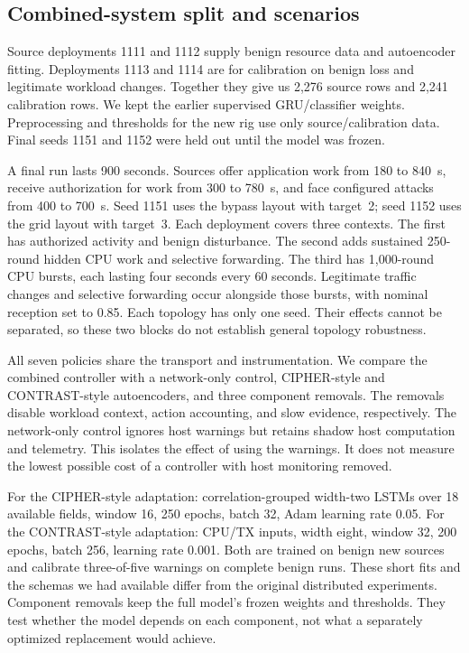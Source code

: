 \documentclass[journal]{IEEEtran}
\begin{document}
\subsection{Combined-system split and scenarios}\label{sec:combinedsetup}
Source deployments 1111 and 1112 supply benign resource data and autoencoder fitting. Deployments 1113 and 1114 are for calibration on benign loss and legitimate workload changes. Together they give us 2,276 source rows and 2,241 calibration rows. We kept the earlier supervised GRU/classifier weights. Preprocessing and thresholds for the new rig use only source/calibration data. Final seeds 1151 and 1152 were held out until the model was frozen.

A final run lasts 900 seconds. Sources offer application work from 180 to 840~s, receive authorization for work from 300 to 780~s, and face configured attacks from 400 to 700~s. Seed 1151 uses the bypass layout with target~2; seed 1152 uses the grid layout with target~3. Each deployment covers three contexts. The first has authorized activity and benign disturbance. The second adds sustained 250-round hidden CPU work and selective forwarding. The third has 1,000-round CPU bursts, each lasting four seconds every 60 seconds. Legitimate traffic changes and selective forwarding occur alongside those bursts, with nominal reception set to 0.85. Each topology has only one seed. Their effects cannot be separated, so these two blocks do not establish general topology robustness.

All seven policies share the transport and instrumentation. We compare the combined controller with a network-only control, CIPHER-style and CONTRAST-style autoencoders, and three component removals. The removals disable workload context, action accounting, and slow evidence, respectively. The network-only control ignores host warnings but retains shadow host computation and telemetry. This isolates the effect of using the warnings. It does not measure the lowest possible cost of a controller with host monitoring removed.

For the CIPHER-style adaptation: correlation-grouped width-two LSTMs over 18 available fields, window 16, 250 epochs, batch 32, Adam learning rate 0.05. For the CONTRAST-style adaptation: CPU/TX inputs, width eight, window 32, 200 epochs, batch 256, learning rate 0.001. Both are trained on benign new sources and calibrate three-of-five warnings on complete benign runs. These short fits and the schemas we had available differ from the original distributed experiments. Component removals keep the full model's frozen weights and thresholds. They test whether the model depends on each component, not what a separately optimized replacement would achieve.
\end{document}
